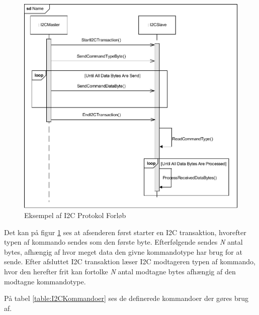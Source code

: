 \begin{figure}[H]
	\centering
	\includegraphics[width=\textwidth] {Systemarkitektur/images/I2CProtocol}
	\caption{Eksempel af I2C Protokol Forløb}
	\label{fig:I2CProtokolEksempel}
\end{figure}

Det kan på figur \ref{fig:I2CProtokolEksempel} ses at afsenderen først starter en I2C transaktion, hvorefter typen af kommando sendes som den første byte. Efterfølgende sendes \textit{N} antal bytes, afhængig af hvor meget data den givne kommandotype har brug for at sende. Efter afsluttet I2C transaktion læser I2C modtageren typen af kommando, hvor den herefter frit kan fortolke \textit{N} antal modtagne bytes afhængig af den modtagne kommandotype.

På tabel \ref{table:I2CKommandoer} ses de definerede kommandoer der gøres brug af.

